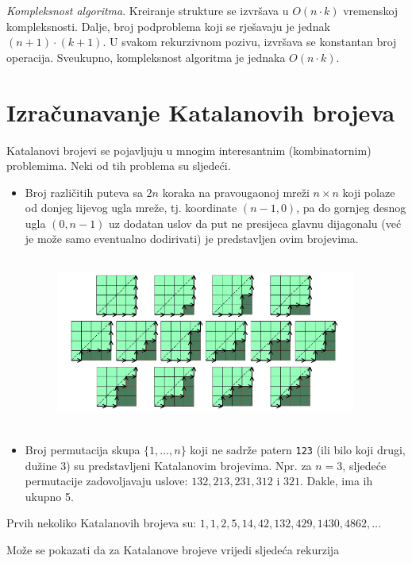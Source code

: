   \textit{Kompleksnost algoritma}.  Kreiranje strukture se izvršava u $O(n\cdot k)$ vremenskoj kompleksnosti. Dalje,  broj podproblema koji se rješavaju je jednak $(n+1) \cdot (k+1)$.  U svakom rekurzivnom pozivu, izvršava se konstantan broj operacija. Sveukupno, kompleksnost algoritma je jednaka $O(n \cdot k)$. 
  
  
  
   
 \section{Izračunavanje Katalanovih brojeva}
 
 Katalanovi brojevi se pojavljuju u mnogim interesantnim (kombinatornim)
 problemima. Neki od tih problema su sljedeći. 
 
 \begin{itemize}
 	\item Broj različitih puteva sa $2n$ koraka na pravougaonoj mreži $n \times n$ koji polaze od 	donjeg lijevog ugla mreže, tj. koordinate $(n - 1, 0)$, pa do gornjeg desnog ugla $(0, n -1)$ uz dodatan uslov da put ne presijeca glavnu dijagonalu (već je može samo eventualno dodirivati) je predstavljen ovim brojevima.
 	
 	\begin{figure}[H]
 		\centering
 		\includegraphics[width=280pt,height=160pt]{slike/catalan-net.png}
 	\end{figure}
 	\item Broj permutacija skupa $\{1, \ldots, n \}$ koji ne sadrže patern \texttt{123} (ili bilo koji drugi, dužine 3) su predstavljeni Katalanovim brojevima. Npr. za $n = 3$, sljedeće permutacije zadovoljavaju uslove: $132,
 	213, 231, 312$ i $321$.  Dakle, ima ih ukupno 5. 
 \end{itemize}
 
 Prvih nekoliko Katalanovih brojeva su: $1, 1, 2, 5, 14, 42, 132,
 429, 1430, 4862, \ldots $
 
 
 Može se pokazati da za Katalanove brojeve vrijedi sljedeća rekurzija
 
